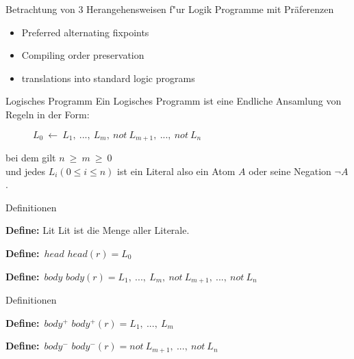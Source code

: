 

\begin{frame}
  Betrachtung von 3 Herangehensweisen f"ur Logik Programme mit Präferenzen
  \begin{itemize}
    \item Preferred alternating fixpoints
    \item Compiling order preservation
    \item translations into standard logic programs
  \end{itemize}
\end{frame}


\begin{frame}{Logisches Programm}
  Ein Logisches Programm ist eine Endliche Ansamlung von Regeln in der Form:
  \begin{figure}
    \begin{math}
      L_0~\leftarrow~L_1,~...,~L_m,~not~L_{m+1},~...,~not~L_n
    \end{math}
  \end{figure}
  bei dem gilt $n~\geq~m~\geq~0$\\[0.5cm]
  und jedes $L_i (0 \leq i \leq n)$ ist ein Literal also ein Atom $A$ oder seine Negation $\neg A$.\\
\end{frame}

\begin{frame}{Definitionen}
  \begin{block}{\textbf{Define:} Lit}
    Lit ist die Menge aller Literale.
  \end{block}
  \begin{block}{\textbf{Define:}~$head$}
  $head(r) = L_0$
  \end{block}
  \begin{block}{\textbf{Define:}~$body$}
  $body(r) = {L_1,~...,~L_m,~not~L_{m+1},~...,~not~L_n}$
  \end{block}
\end{frame}


\begin{frame}{Definitionen}
  \begin{block}{\textbf{Define:}~$body^+$}
  $body^+(r) = {L_1,~...,~L_m}$
  \end{block}
  \begin{block}{\textbf{Define:}~$body^-$}
  $body^-(r) = {not~L_{m+1},~...,~not~L_n}$
  \end{block}
\end{frame}

